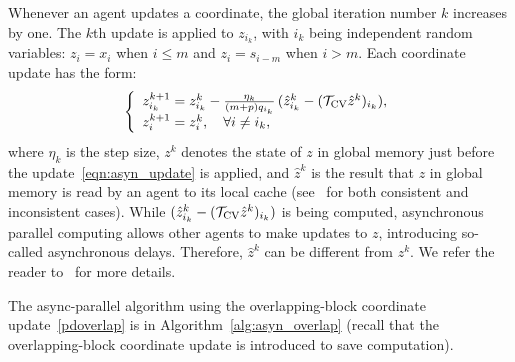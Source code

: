 {{{Whenever an agent updates a coordinate, the global iteration number $k$ increases by one.
The $k$th update is applied to $z_{i_k}$, with $i_k$ being independent random variables: $z_i=x_i$ when $i\leq m$ and $z_i=s_{i-m}$ when $i>m$.  Each coordinate update has
the form:
\begin{equation}
\label{eqn:asyn_update}
\left\{
\begin{array}{l}
z_{i_k}^{k+1} = z_{i_k}^k - \frac{\eta_k}{(m+p)q_{i_k}} \, (\hat{z}^k_{i_k}-(\TVC \hat{z}^k)_{i_k}),\\
z_i^{k+1}=z_i^k,\quad \forall i\neq i_k,
\end{array}
\right.
\end{equation}
where $\eta_k$ is the step size, $z^k$ denotes the state of $z$ in global memory just before the update~\eqref{eqn:asyn_update} is applied, and $\hat{z}^k$ is the result that $z$ in global memory is read by an agent to its local cache (see~\cite[\S 1.2]{Peng_2015_AROCK} for both consistent and inconsistent cases). While $(\hat{z}^k_{i_k}-({{\mathcal{T}}_{\textnormal{CV}}} \hat{z}^k)_{i_k})$ is being computed, asynchronous parallel computing allows other agents to make updates to $z$, introducing so-called asynchronous delays. Therefore, $\hat{z}^k$
can be different from $z^k$. We refer the reader to~\cite[\S 1.2]{Peng_2015_AROCK} for more details.

The async-parallel algorithm using the overlapping-block coordinate update~\eqref{pdoverlap} is in Algorithm~\ref{alg:asyn_overlap} (recall that the overlapping-block coordinate update is introduced to save computation).

}}}
